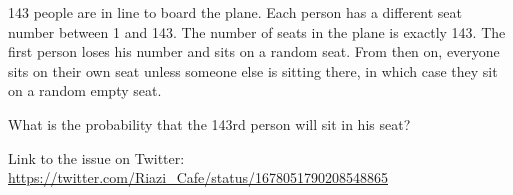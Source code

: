 \begin{problem}143 people are in line to board the plane. Each person has a different seat number between 1 and 143. The number of seats in the plane is exactly 143. The first person loses his number and sits on a random seat. From then on, everyone sits on their own seat unless someone else is sitting there, in which case they sit on a random empty seat.

What is the probability that the 143rd person will sit in his seat?

Link to the issue on Twitter:  \href{https://twitter.com/Riazi_Cafe/status/1678051790208548865}{https://twitter.com/Riazi_Cafe/status/1678051790208548865}\end{problem}